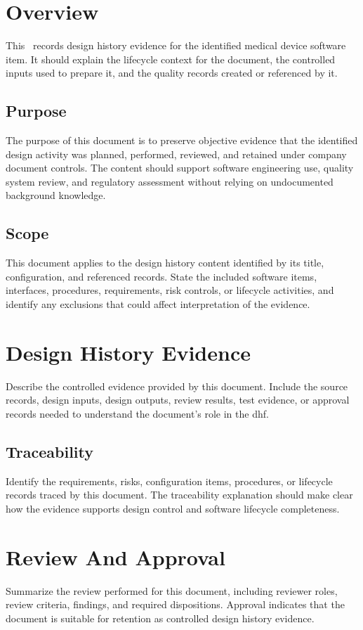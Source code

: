 \section{Overview}
This \stdDhf\ records design history evidence for the identified medical device
software item.  It should explain the lifecycle context for the document, the
controlled inputs used to prepare it, and the quality records created or
referenced by it.

\subsection{Purpose}
The purpose of this document is to preserve objective evidence that the
identified design activity was planned, performed, reviewed, and retained under
\Gls{company} document controls.  The content should support software
engineering use, quality system review, and regulatory assessment without relying
on undocumented background knowledge.

\subsection{Scope}
This document applies to the design history content identified by its title,
configuration, and referenced records.  State the included software items,
interfaces, procedures, requirements, risk controls, or lifecycle activities, and
identify any exclusions that could affect interpretation of the evidence.

\section{Design History Evidence}
Describe the controlled evidence provided by this document.  Include the source
records, design inputs, design outputs, review results, test evidence, or
approval records needed to understand the document's role in the \Gls{dhf}.

\subsection{Traceability}
Identify the requirements, risks, configuration items, procedures, or lifecycle
records traced by this document.  The traceability explanation should make clear
how the evidence supports design control and software lifecycle completeness.

\section{Review And Approval}
Summarize the review performed for this document, including reviewer roles,
review criteria, findings, and required dispositions.  Approval indicates that
the document is suitable for retention as controlled design history evidence.

